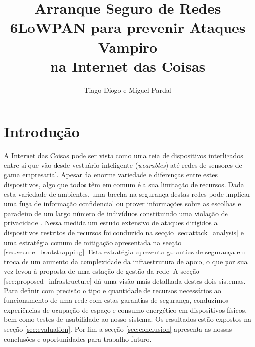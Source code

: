 \documentclass{llncs}
\begin{document}
\title{Arranque Seguro de Redes 6LoWPAN para prevenir Ataques Vampiro\\ na Internet das Coisas}
%
%
\author{Tiago Diogo e Miguel Pardal}
%
%
%

\maketitle              %

\section{Introdução}
A Internet das Coisas pode ser vista como uma teia de dispositivos interligados entre si que vão desde vestuário inteligente (\textit{wearables}) até redes de sensores de gama empresarial. Apesar da enorme variedade e diferenças entre estes dispositivos, algo que todos têm em comum é a sua limitação de recursos. 
Dada esta variedade de ambientes, uma brecha na segurança destas redes pode implicar uma fuga de informação confidencial ou prover informações sobre as escolhas e paradeiro de um largo número de indivíduos constituindo uma violação de privacidade \cite{Ukil2015}. 
Nessa medida um estudo extensivo de ataques dirigidos a dispositivos restritos de recursos foi conduzido na secção \ref{sec:attack_analysis} e uma estratégia comum de mitigação apresentada na secção \ref{sec:secure_bootstrapping}. 
Esta estratégia apresenta garantias de segurança em troca de um aumento da complexidade da infraestrutura de apoio, o que por sua vez levou à proposta de uma estação de gestão da rede. 
A secção \ref{sec:proposed_infrastructure} dá uma visão mais detalhada destes dois sistemas. Para definir com precisão o tipo e quantidade de recursos necessários ao funcionamento de uma rede com estas garantias de segurança, conduzimos experiências de ocupação de espaço e consumo energético em dispositivos físicos, bem como testes de usabilidade ao nosso sistema. 
Os resultados estão expostos na secção \ref{sec:evaluation}. Por fim a secção \ref{sec:conclusion} apresenta as nossas conclusões e oportunidades para trabalho futuro.
\end{document}
